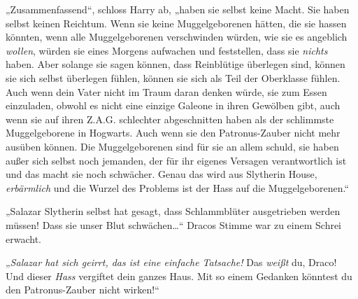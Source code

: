 „Zusammenfassend“, schloss Harry ab, „haben sie selbst keine Macht. Sie haben selbst keinen Reichtum. Wenn sie keine Muggelgeborenen hätten, die sie hassen könnten, wenn alle Muggelgeborenen verschwinden würden, wie sie es angeblich \emph{wollen}, würden sie eines Morgens aufwachen und feststellen, dass sie \emph{nichts} haben. Aber solange sie sagen können, dass Reinblütige überlegen sind, können sie sich selbst überlegen fühlen, können sie sich als Teil der Oberklasse fühlen. Auch wenn dein Vater nicht im Traum daran denken würde, sie zum Essen einzuladen, obwohl es nicht eine einzige Galeone in ihren Gewölben gibt, auch wenn sie auf ihren Z.A.G. schlechter abgeschnitten haben als der schlimmste Muggelgeborene in Hogwarts. Auch wenn sie den Patronus-Zauber nicht mehr ausüben können. Die Muggelgeborenen sind für sie an allem schuld, sie haben außer sich selbst noch jemanden, der für ihr eigenes Versagen verantwortlich ist und das macht sie noch schwächer. Genau das wird aus Slytherin House, \emph{erbärmlich} und die Wurzel des Problems ist der Hass auf die Muggelgeborenen.“

„Salazar Slytherin selbst hat gesagt, dass Schlammblüter ausgetrieben werden müssen! Dass sie unser Blut schwächen…“ Dracos Stimme war zu einem Schrei erwacht.

„\emph{Salazar hat sich geirrt, das ist eine einfache Tatsache!} Das \emph{weißt} du, Draco! Und dieser \emph{Hass} vergiftet dein ganzes Haus. Mit so einem Gedanken könntest du den Patronus-Zauber nicht wirken!“


